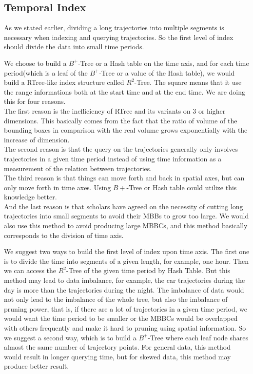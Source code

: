 \documentclass[sigplan]{acmart}
\begin{document}
\subsection{Temporal Index}
As we stated earlier, dividing a long trajectories into multiple segments is necessary when indexing and querying trajectories. So the first level of index should divide the data into small time periods.\par
We choose to build a $B^+$-Tree or a Hash table on the time axis, and for each time period(which is a leaf of the $B^+$-Tree or a value of the Hash table), we would build a RTree-like index structure called $R^2$-Tree. The square means that it use the range informations both at the start time and at the end time. We are doing this for four reasons.\\
\indent The first reason is the inefficiency of RTree and its variants on 3 or higher dimensions. This basically comes from the fact that the ratio of volume of the bounding boxes in comparison with the real volume grows exponentially with the increase of dimension.\\
\indent The second reason is that the query on the trajectories generally only involves trajectories in a given time period instead of using time information as a measurement of the relation between trajectories.\\
\indent The third reason is that things can move forth and back in spatial axes, but can only move forth in time axes. Using $B+$-Tree or Hash table could utilize this knowledge better.\\
\indent And the last reason is that scholars have agreed on the necessity of cutting long trajectories into small segments to avoid their MBBs to grow too large. We would also use this method to avoid producing large MBBCs, and this method basically corresponds to the division of time axis.\par

We suggest two ways to build the first level of index upon time axis. The first one is to divide the time into segments of a given length, for example, one hour. Then we can access the $R^2$-Tree of the given time period by Hash Table. But this method may lead to data imbalance, for example, the car trajectories during the day is more than the trajectories during the night. The imbalance of data would not only lead to the imbalance of the whole tree, but also the imbalance of pruning power, that is, if there are a lot of trajectories in a given time period, we would want the time period to be smaller or the MBBCs would be overlapped with others frequently and make it hard to pruning using spatial information. So we suggest a second way, which is to build a $B^+$-Tree where each leaf node shares almost the same number of trajectory points. For general data, this method would result in longer querying time, but for skewed data, this method may produce better result.\par
\end{document}
